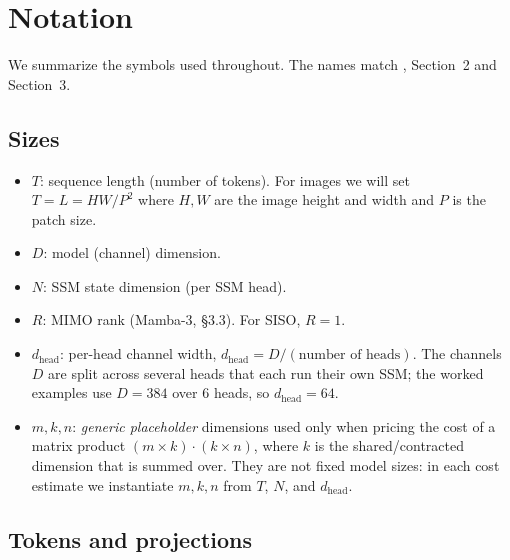 \documentclass[11pt,a4paper]{article}
\begin{document}
\section{Notation}
\label{sec:notation}

We summarize the symbols used throughout. The names match
\cite{mamba3}, Section~2 and Section~3.

\subsection{Sizes}\label{sec:sizes}

\begin{itemize}
  \item $T$: sequence length (number of tokens). For images we will
        set $T = L = HW/P^2$ where $H,W$ are the image height and
        width and $P$ is the patch size.
  \item $D$: model (channel) dimension.
  \item $N$: SSM state dimension (per SSM head).
  \item $R$: MIMO rank (Mamba-3, \S 3.3). For SISO, $R=1$.
  \item $d_{\text{head}}$: per-head channel width, $d_{\text{head}} =
        D/(\text{number of heads})$. The channels $D$ are split across
        several heads that each run their own SSM; the worked examples
        use $D=384$ over $6$ heads, so $d_{\text{head}}=64$.
  \item $m, k, n$: \emph{generic placeholder} dimensions used only when
        pricing the cost of a matrix product $(m\times k)\cdot(k\times
        n)$, where $k$ is the shared/contracted dimension that is summed
        over. They are not fixed model sizes: in each cost estimate we
        instantiate $m,k,n$ from $T$, $N$, and $d_{\text{head}}$.
\end{itemize}

\subsection{Tokens and projections}
\end{document}
